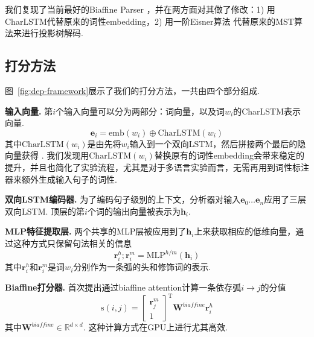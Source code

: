 我们复现了当前最好的Biaffine Parser \citep{dozat-etal-2017-biaffine}，并在两方面对其做了修改：1) 用CharLSTM代替原来的词性embedding，2) 用一阶Eisner算法 \citep{eisner-2000-iwptbook}代替原来的MST算法来进行投影树解码.

\subsection{打分方法}
图~\ref{fig:dep-framework}展示了我们的打分方法，一共由四个部分组成.

\noindent\textbf{输入向量.}
第$i$个输入向量可以分为两部分：词向量，以及词$w_i$的CharLSTM表示向量.
\begin{equation}
  \label{eq:input}
  \mathbf{e}_i=\mathrm{emb}({w_i}) \oplus \mathrm{CharLSTM}(w_i)
\end{equation}
其中$\mathrm{CharLSTM}(w_i)$是由先将$w_i$输入到一个双向LSTM，然后拼接两个最后的隐向量获得 \citep{lample-etal-2016-neural}.
我们发现用$\mathrm{CharLSTM}(w_i)$替换原有的词性embedding会带来稳定的提升，并且也简化了实验流程，尤其是对于多语言实验而言，无需再用到词性标注器来额外生成输入句子的词性.

\noindent\textbf{双向LSTM编码器.}
为了编码句子级别的上下文，分析器对输入$\mathbf{e}_0 \dots \mathbf{e}_n$应用了三层双向LSTM.
顶层的第$i$个词的输出向量被表示为$\mathbf{h}_i$.

\noindent\textbf{MLP特征提取层.}
两个共享的MLP层被应用到了$\mathbf{h}_i$上来获取相应的低维向量，通过这种方式只保留句法相关的信息
\begin{equation}
  \label{mlp-arc}
  \mathbf{r}_i^{h}; \mathbf{r}_i^{m} =\mathrm{MLP}^{h/m} \left( \mathbf{h}_i \right)
\end{equation}
其中$\mathbf{r}_i^{h}$和$\mathbf{r}_i^{m}$是词$w_i$分别作为一条弧的头和修饰词的表示.

\noindent\textbf{Biaffine打分器.}
\citet{dozat-etal-2017-biaffine}首次提出通过biaffine attention计算一条依存弧$i \rightarrow j$的分值
\begin{equation} \label{eq:biaffine}
  \mathrm{s}(i,j) =  \left[
    \begin{array}{c}
      \mathbf{r}_{j}^{m} \\
      1
    \end{array}
    \right]^\mathrm{T}
  \mathbf{W}^\textit{biaffine}  \mathbf{r}_{i}^{h}
\end{equation}
其中$\mathbf{W}^\textit{biaffine} \in \mathbb{R}^{d \times d}$.
这种计算方式在GPU上进行尤其高效.

